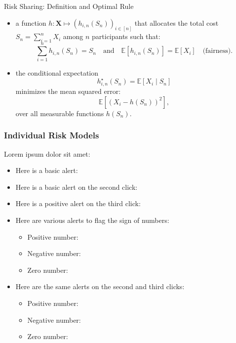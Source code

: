 \documentclass[11pt,xcolor={dvipsnames},hyperref={pdftex,pdfpagemode=UseNone,hidelinks,pdfdisplaydoctitle=true},usepdftitle=false]{beamer}
\begin{document}
\begin{frame}{Risk Sharing: Definition and Optimal Rule}

    \begin{itemize}
        \item {} a function $h: \boldsymbol{X} \mapsto (h_{i,n}(S_n))_{i \in [n]}$ that allocates the total cost $S_n = \sum_{i=1}^n X_i$ among $n$ participants such that:
        \begin{equation*}
        \sum_{i=1}^n h_{i,n}(S_n) = S_n
        \quad \text{and} \quad
        \mathbb{E}[h_{i,n}(S_n)] = \mathbb{E}[X_i] \quad \text{(fairness)}.
        \end{equation*}
        \pause
        \item {} the conditional expectation
        \begin{equation*}
        h_{i,n}^{\star}(S_n) = \mathbb{E}[X_i \mid S_n]
        \end{equation*}
        minimizes the mean squared error:
        \begin{equation*}
        \mathbb{E}\left[(X_i - h(S_n))^2\right],
        \end{equation*}
        over all measurable functions $h(S_n)$.
    \end{itemize}
    \end{frame}


\begin{frame}
    \frametitle{Individual Risk Models}
    Lorem ipsum dolor sit amet:
    \begin{itemize}
    \item Here is a basic alert: 
    \item Here is a basic alert on the second click: 
    \item Here is a positive alert on the third click: 
    \item Here are various alerts to flag the sign of numbers:
    \begin{itemize}
    \item Positive number: 
    \item Negative number: 
    \item Zero number: 
    \end{itemize}
    \item Here are the same alerts on the second and third clicks:
    \begin{itemize}
    \item Positive number: 
    \item Negative number: 
    \item Zero number: 
    \end{itemize}
    \end{itemize}
    \end{frame}
\end{document}
